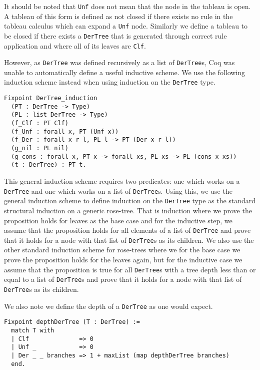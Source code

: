 \documentclass{llncs}
\begin{document}
It should be noted that \verb+Unf+ does not mean that the node in the tableau
is open. A tableau of this form is defined as not closed if there exists no
rule in the tableau calculus which can expand a \verb+Unf+ node. Similarly we
define a tableau to be closed if there exists a \verb+DerTree+ that is
generated through correct rule application and where all of its leaves are
\verb+Clf+.

However, as \verb+DerTree+ was defined recursively as a list of
\verb+DerTree+s, Coq was unable to automatically define a useful inductive
scheme. We use the following induction scheme instead when using induction on
the \verb+DerTree+ type.

\begin{verbatim}
Fixpoint DerTree_induction
  (PT : DerTree -> Type)
  (PL : list DerTree -> Type)
  (f_Clf : PT Clf)
  (f_Unf : forall x, PT (Unf x))
  (f_Der : forall x r l, PL l -> PT (Der x r l))
  (g_nil : PL nil)
  (g_cons : forall x, PT x -> forall xs, PL xs -> PL (cons x xs))
  (t : DerTree) : PT t.
\end{verbatim}

This general induction scheme requires two predicates: one which works on a
\verb+DerTree+ and one which works on a list of \verb+DerTree+s. Using this,
we use the general induction scheme to define induction on the \verb+DerTree+
type as the standard structural induction on a generic rose-tree. That is 
induction where we prove the proposition holds for leaves as the base case and
for the inductive step, we assume that the proposition holds for all elements
of a list of \verb+DerTree+ and prove that it holds for a node with that list
of \verb+DerTree+s as its children. We also use the other standard induction
scheme for rose-trees where we for the base case we prove the proposition holds
for the leaves again, but for the inductive case we assume that the proposition
is true for all \verb+DerTree+s with a tree depth less than or equal to a list
of \verb+DerTree+s and prove that it holds for a node with that list of
\verb+DerTree+s as its children.

We also note we define the depth of a \verb+DerTree+ as one would expect.

\begin{verbatim}
Fixpoint depthDerTree (T : DerTree) :=
  match T with
  | Clf              => 0
  | Unf _            => 0
  | Der _ _ branches => 1 + maxList (map depthDerTree branches)
  end.
\end{verbatim}
\end{document}
